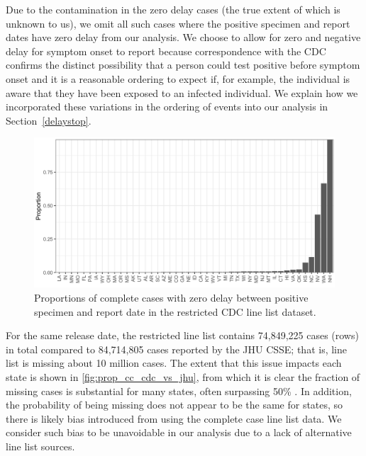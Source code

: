 \documentclass{article}
\begin{document}
Due to the contamination in the zero delay cases (the true extent of
which is unknown to us), we omit all such cases where the positive specimen and 
report dates have zero delay from our analysis.
We choose to allow for zero and negative delay for symptom onset to report because 
correspondence with the CDC confirms the distinct possibility that a person could 
test positive before symptom onset and it is a reasonable ordering to expect if, for 
example, the individual is aware that they have been exposed to an infected individual. 
We explain how we incorporated these variations in the ordering of events into our 
analysis in Section~\ref{delaystop}. 

\begin{figure}[!tb]
\centering
    \includegraphics[width=.99\textwidth]{prop_cc_zero_delay.pdf}
    \caption{Proportions of complete cases with zero delay between positive specimen
     and report date in the restricted CDC line list dataset.}
    \label{fig:prop_cc_zero_delay}
\end{figure}

For the same release date, the restricted line list contains 74,849,225 cases
(rows) in total compared to 84,714,805 cases reported by the JHU CSSE; that is,
line list is missing about 10 million cases. The
extent that this issue impacts each state is shown in
\autoref{fig:prop_cc_cdc_vs_jhu}, from which it is clear the fraction of missing
cases is substantial for many states, often surpassing 50\%
\citep{jahja2022real}. In addition, the probability of being missing does not
appear to be the same for states, so there is likely bias introduced from using
the complete case line list data. We consider such bias to be unavoidable in our
analysis due to a lack of alternative line list sources.
\end{document}

